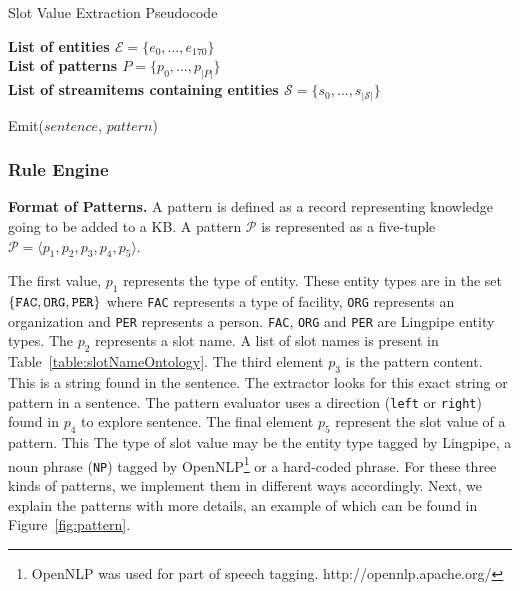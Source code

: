 \begin{algorithm}
  \caption{Slot Value Extraction Pseudocode}
  \textbf{List of entities $\mathcal{E} = \{e_0, \ldots, e_{170}\}$}\\
  \textbf{List of patterns $P = \{p_0, \ldots, p_{|P|}\}$}\\
  \textbf{List of streamitems containing entities $\mathcal{S} = \{s_0, \ldots, s_{|\mathcal{S}|}\}$}\\
  
  \begin{algorithmic}%
                \STATE Emit($sentence$, $pattern$)
              \ENDIF
	    \ENDFOR
          \ENDIF
        \ENDFOR
      \ENDFOR
    \ENDFOR
  \end{algorithmic}
\end{algorithm}


\subsubsection{Rule Engine}

\textbf{Format of Patterns.} A pattern is defined as a record representing knowledge going to be added to a KB. A pattern $\mathcal{P}$ is represented as a five-tuple $\mathcal{P} = \langle p_1, p_2, p_3, p_4, p_5 \rangle$.


The first value, $p_1$ represents the type of entity. These entity types are in the set $\{ \text{\tt FAC}, \text{\tt ORG}, \text{\tt PER} \}$ where \texttt{FAC} represents a type of facility, \texttt{ORG} represents an organization and \texttt{PER} represents a person. \texttt{FAC}, \texttt{ORG} and \texttt{PER} are Lingpipe entity types. The $p_2$ represents a slot name. A list of slot names is present in Table~\ref{table:slotNameOntology}. The third element $p_3$ is the pattern content. This is a string found in the sentence. The extractor looks for this exact string or pattern in a sentence. The pattern evaluator uses a direction (\texttt{left} or \texttt{right}) found in $p_4$ to explore sentence. The final element $p_5$ represent the slot value of a pattern. This %
The type of slot value may be the entity type tagged by Lingpipe, a noun phrase (\texttt{NP}) tagged by OpenNLP\footnote{OpenNLP was used for part of speech tagging. http://opennlp.apache.org/‎} or a hard-coded phrase. For these three kinds of patterns, we implement them in different 
ways accordingly. Next, we explain the patterns with more details, an example of which can be found in Figure~\ref{fig:pattern}. 

